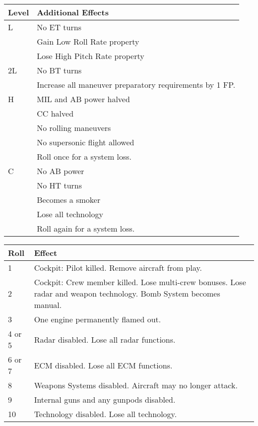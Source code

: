 \documentclass[10pt]{article}
\begin{document}
\begin{table}
\label{table:damage-effects}
\begin{tabular}{lp{7cm}}
\hline
Level&Additional Effects\\
\hline
L
&No ET turns\\
&Gain Low Roll Rate property\\
&Lose High Pitch Rate property\\
\hline
2L
&No BT turns\\
&Increase all maneuver preparatory requirements by 1 FP.\\
\hline
H
&MIL and AB power halved\\
&CC halved\\
&No rolling maneuvers\\
&No supersonic flight allowed\\
&Roll once for a system loss.\\
\hline
C
&No AB power\\
&No HT turns\\
&Becomes a smoker\\
&Lose all technology\\
&Roll again for a system loss.\\
\hline
\end{tabular}
\end{table}

\begin{table}
\label{table:system-loss}
\begin{tabular}{lp{7cm}}
\hline
Roll&Effect\\
\hline
1& Cockpit: Pilot killed. Remove aircraft from play.\\
2& Cockpit: Crew member killed. Lose multi-crew
bonuses. Lose radar and weapon technology.
Bomb System becomes manual.\\
3& One engine permanently flamed out.\\
4 or 5& Radar disabled. Lose all radar functions.\\
6 or 7& ECM disabled. Lose all ECM functions.\\
8& Weapons Systems disabled. Aircraft may no longer
attack.\\
9& Internal guns and any gunpods disabled.\\
10& Technology disabled. Lose all technology.\\
\hline
\end{tabular}
\end{table}
\end{document}
